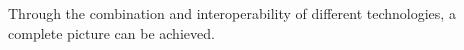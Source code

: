 Through the combination and interoperability of different technologies, a complete picture can be achieved.


